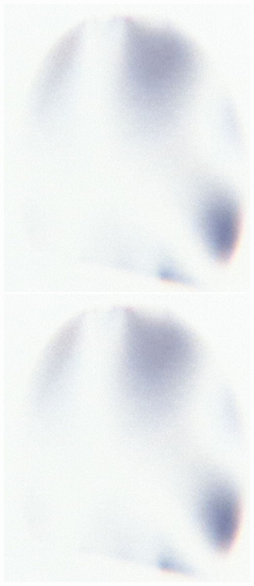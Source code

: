 \includegraphics[height=0.3\textheight]{Filter.jpg}
\hfill
\includegraphics[height=0.3\textheight]{Filter.jpg}
